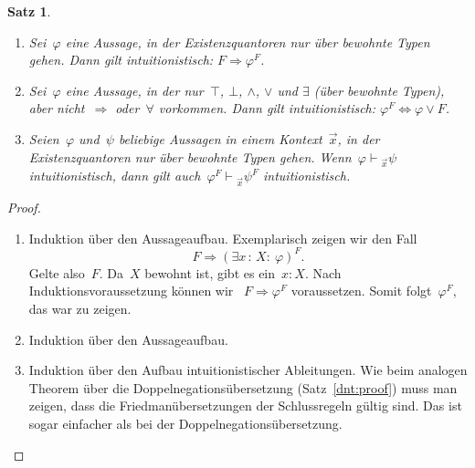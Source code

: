 \documentclass[a4paper,ngerman,12pt]{scrartcl}
\theoremstyle{definition}
\theoremstyle{plain}
\newtheorem{satz}[defn]{Satz}
\theoremstyle{remark}
\newcommand{\seq}[1]{\mathrel{\vdash\!\!\!_{#1}}}
\renewcommand{\_}{\mathpunct{.}\,}
\newcommand{\?}{\,{:}\,}
\begin{document}
\begin{satz}\label{friedman:proof}
\begin{enumerate}
\item Sei~$\varphi$ eine Aussage, in der Existenzquantoren nur über bewohnte
Typen gehen. Dann gilt intuitionistisch: $F \Longrightarrow \varphi^F$.

\item Sei~$\varphi$ eine Aussage, in der nur~$\top$, $\bot$,
$\wedge$, $\vee$ und $\exists$ (über
bewohnte Typen), aber nicht~$\Rightarrow$ oder~$\forall$ vorkommen.
Dann gilt intuitionistisch: $\varphi^F \Longleftrightarrow \varphi \vee F$.

\item Seien~$\varphi$ und~$\psi$ beliebige Aussagen in einem Kontext~$\vec x$,
in der Existenzquantoren nur über bewohnte Typen gehen.
Wenn~$\varphi \seq{\vec x} \psi$ intuitionistisch, dann gilt auch~$\varphi^F
\seq{\vec x} \psi^F$ intuitionistisch.
\end{enumerate}
\end{satz}
\begin{proof}
\begin{enumerate}
\item Induktion über den Aussageaufbau. Exemplarisch zeigen wir den Fall
\[ F \Longrightarrow (\exists x\?X{:}\ \varphi)^F. \]
Gelte also~$F$. Da~$X$ bewohnt ist, gibt es ein~$x : X$. Nach
Induktionsvoraussetzung können wir ~$F \Rightarrow \varphi^F$ voraussetzen.
Somit folgt~$\varphi^F$, das war zu zeigen.
\item Induktion über den Aussageaufbau.
\item Induktion über den Aufbau intuitionistischer Ableitungen. Wie beim
analogen Theorem über die Doppelnegationsübersetzung (Satz~\ref{dnt:proof})
muss man zeigen, dass die Friedmanübersetzungen der Schlussregeln gültig sind.
Das ist sogar einfacher als bei der Doppelnegationsübersetzung.\qedhere
\end{enumerate}
\end{proof}
\end{document}
